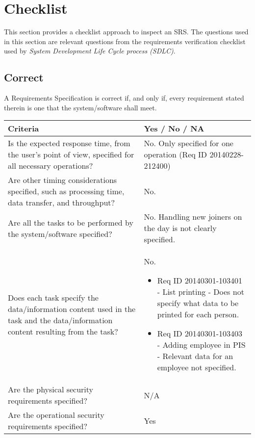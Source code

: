 \documentclass[Main]{subfiles}
\begin{document}
\section{Checklist}

This section provides a checklist approach to inspect an SRS. The questions used in this section are relevant questions from the requirements verification checklist used by \textit{System Development Life Cycle process (SDLC)}.

\subsection{Correct}
A Requirements Specification is correct if, and only if, every requirement stated therein is one that the system/software shall meet.

\begin{longtable}{p{8cm} | p{7.3cm}}
\textbf{Criteria} & \textbf{Yes / No / NA} \\ \hline

Is the expected response time, from the user’s point of view, specified for all necessary operations? & No. Only specified for one operation (Req ID 20140228-212400) \\ \hline

Are other timing considerations specified, such as processing time, data transfer, and throughput? & No. \\ \hline

Are all the tasks to be performed by the system/software specified? & No. Handling new joiners on the day is not clearly specified. \\ \hline

Does each task specify the data/information content used in the task and the data/information content resulting from the task? & No. 
\begin{itemize}
\item Req ID 20140301-103401 - List printing - Does not specify what data to be printed for each person.
\item Req ID 20140301-103403 - Adding employee in PIS - Relevant data for an employee not specified.
\end{itemize} \\ \hline

Are the physical security requirements specified? & N/A \\ \hline
Are the operational security requirements specified? & Yes \\ \hline


\end{longtable}
\end{document}
